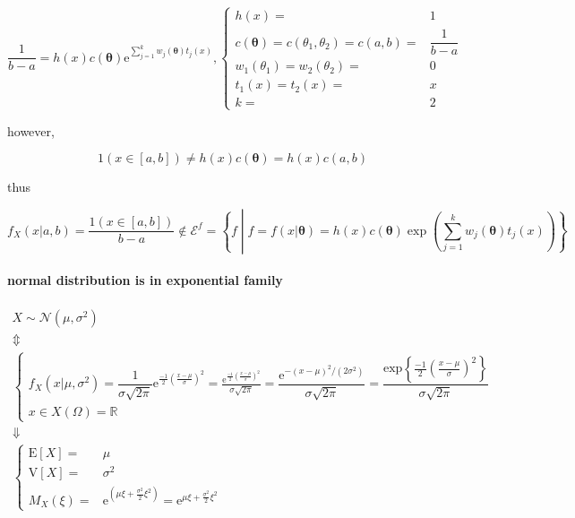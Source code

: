 \documentclass[
]{book}
\theoremstyle{definition}
\theoremstyle{definition}
\theoremstyle{definition}
\theoremstyle{definition}
\theoremstyle{remark}
\begin{document}
\[
\dfrac{1}{b-a}=h\left(x\right)c\left(\boldsymbol{\theta}\right)\mathrm{e}^{{\scriptscriptstyle \sum\limits _{j=1}^{k}w_{{\scriptscriptstyle j}}\left(\boldsymbol{\theta}\right)t_{{\scriptscriptstyle j}}\left(x\right)}},\begin{cases}
h\left(x\right)= & 1\\
c\left(\boldsymbol{\theta}\right)=c\left(\theta_{{\scriptscriptstyle 1}},\theta_{{\scriptscriptstyle 2}}\right)=c\left(a,b\right)= & \dfrac{1}{b-a}\\
w_{{\scriptscriptstyle 1}}\left(\theta_{{\scriptscriptstyle 1}}\right)=w_{{\scriptscriptstyle 2}}\left(\theta_{{\scriptscriptstyle 2}}\right)= & 0\\
t_{{\scriptscriptstyle 1}}\left(x\right)=t_{{\scriptscriptstyle 2}}\left(x\right)= & x\\
k= & 2
\end{cases}
\]

however,

\[
1\left(x\in\left[a,b\right]\right)\ne h\left(x\right)c\left(\boldsymbol{\theta}\right)=h\left(x\right)c\left(a,b\right)
\]

thus

\[
f_{{\scriptscriptstyle X}}\left(x|a,b\right)=\dfrac{1\left(x\in\left[a,b\right]\right)}{b-a}\notin\mathcal{E}^{f}=\left\{ f\middle|f=f\left(x|\boldsymbol{\theta}\right)=h\left(x\right)c\left(\boldsymbol{\theta}\right)\exp\left(\sum\limits _{j=1}^{k}w_{{\scriptscriptstyle j}}\left(\boldsymbol{\theta}\right)t_{{\scriptscriptstyle j}}\left(x\right)\right)\right\} 
\]

\paragraph{normal distribution is in exponential family}\label{normal-distribution-is-in-exponential-family}

\[
\begin{array}{c}
X\sim\mathcal{N}\left(\mu,\sigma^{2}\right)\\
\Updownarrow\\
\begin{cases}
f_{{\scriptscriptstyle X}}\left(x|\mu,\sigma^{2}\right)=\dfrac{1}{\sigma\sqrt{2\pi}}\mathrm{e}^{\frac{-1}{2}\left(\frac{x-\mu}{\sigma}\right)^{2}}=\frac{\mathrm{e}^{\frac{-1}{2}\left(\frac{x-\mu}{\sigma}\right)^{2}}}{\sigma\sqrt{2\pi}}=\dfrac{\mathrm{e}^{-\left(x-\mu\right)^{2}/\left(2\sigma^{2}\right)}}{\sigma\sqrt{2\pi}}=\dfrac{\mathrm{exp}\left\{ \frac{-1}{2}\left(\frac{x-\mu}{\sigma}\right)^{2}\right\} }{\sigma\sqrt{2\pi}}\\
x\in X\left(\Omega\right)=\mathbb{R}
\end{cases}\\
\Downarrow\\
\begin{cases}
\mathrm{E}\left[X\right]= & \mu\\
\mathrm{V}\left[X\right]= & \sigma^{2}\\
M_{{\scriptscriptstyle X}}\left(\xi\right)= & \mathrm{e}^{\left(\mu\xi+\frac{\sigma^{2}}{2}\xi^{2}\right)}=\mathrm{e}^{\mu\xi+\frac{\sigma^{2}}{2}\xi^{2}}
\end{cases}
\end{array}
\]
\end{document}

